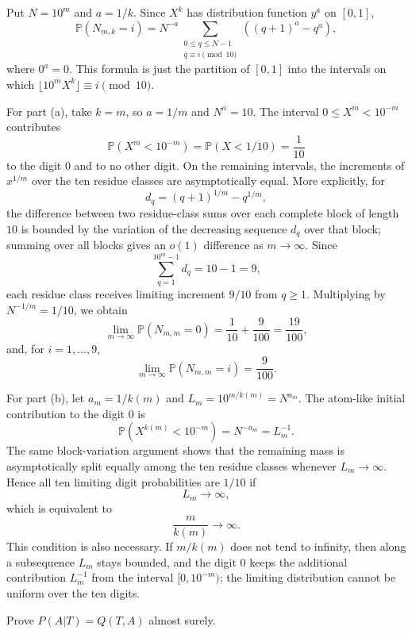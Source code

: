 \begin{solution}
Put $N=10^m$ and $a=1/k$. Since $X^k$ has distribution function $y^a$ on $[0,1]$,
\[
\mathbb{P}(N_{m,k}=i)
=N^{-a}\sum_{\substack{0\leq q\leq N-1\\ q\equiv i\pmod {10}}}
\left((q+1)^a-q^a\right),
\]
where $0^a=0$. This formula is just the partition of $[0,1]$ into the intervals on which $\lfloor 10^mX^k\rfloor\equiv i\pmod {10}$.

For part (a), take $k=m$, so $a=1/m$ and $N^a=10$. The interval $0\leq X^m<10^{-m}$ contributes
\[
\mathbb{P}(X^m<10^{-m})=\mathbb{P}(X<1/10)=\frac{1}{10}
\]
to the digit $0$ and to no other digit. On the remaining intervals, the increments of $x^{1/m}$ over the ten residue classes are asymptotically equal. More explicitly, for
\[
d_q=(q+1)^{1/m}-q^{1/m},
\]
the difference between two residue-class sums over each complete block of length $10$ is bounded by the variation of the decreasing sequence $d_q$ over that block; summing over all blocks gives an $o(1)$ difference as $m\to\infty$. Since
\[
\sum_{q=1}^{10^m-1}d_q=10-1=9,
\]
each residue class receives limiting increment $9/10$ from $q\geq1$. Multiplying by $N^{-1/m}=1/10$, we obtain
\[
\lim_{m\to\infty}\mathbb{P}(N_{m,m}=0)=\frac{1}{10}+\frac{9}{100}=\frac{19}{100},
\]
and, for $i=1,\ldots,9$,
\[
\lim_{m\to\infty}\mathbb{P}(N_{m,m}=i)=\frac{9}{100}.
\]

For part (b), let $a_m=1/k(m)$ and $L_m=10^{m/k(m)}=N^{a_m}$. The atom-like initial contribution to the digit $0$ is
\[
\mathbb{P}(X^{k(m)}<10^{-m})=N^{-a_m}=L_m^{-1}.
\]
The same block-variation argument shows that the remaining mass is asymptotically split equally among the ten residue classes whenever $L_m\to\infty$. Hence all ten limiting digit probabilities are $1/10$ if
\[
L_m\to\infty,
\]
which is equivalent to
\[
\frac{m}{k(m)}\to\infty.
\]
This condition is also necessary. If $m/k(m)$ does not tend to infinity, then along a subsequence $L_m$ stays bounded, and the digit $0$ keeps the additional contribution $L_m^{-1}$ from the interval $[0,10^{-m})$; the limiting distribution cannot be uniform over the ten digits.
\end{solution}

\begin{exercise}\label{probability:2024:4}
Prove $P(A|T) = Q(T,A)$ almost surely.
\end{exercise}

